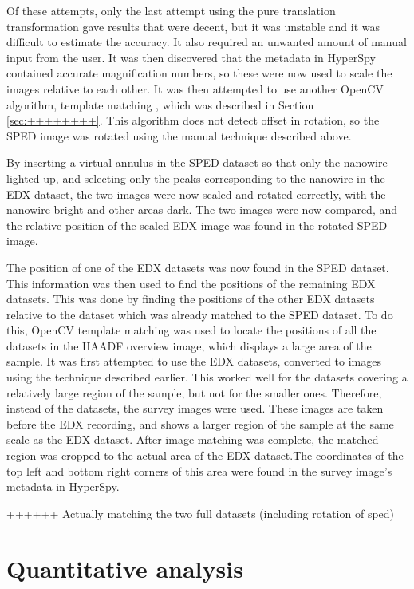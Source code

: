 Of these attempts, only the last attempt using the pure translation transformation gave results that were decent, but it was unstable and it was difficult to estimate the accuracy. It also required an unwanted amount of manual input from the user. It was then discovered that the metadata in HyperSpy contained accurate magnification numbers, so these were now used to scale the images relative to each other. It was then attempted to use another OpenCV algorithm, template matching \cite{open-cv-template-matching}, which was described in Section \ref{sec:++++++++}. This algorithm does not detect offset in rotation, so the SPED image was rotated using the manual technique described above.

By inserting a virtual annulus in the SPED dataset so that only the nanowire lighted up, and selecting only the peaks corresponding to the nanowire in the EDX dataset, the two images were now scaled and rotated correctly, with the nanowire bright and other areas dark.
The two images were now compared, and the relative position of the scaled EDX image was found in the rotated SPED image.

The position of one of the EDX datasets was now found in the SPED dataset. This information was then used to find the positions of the remaining EDX datasets. This was done by finding the positions of the other EDX datasets relative to the dataset which was already matched  to the SPED dataset. To do this, OpenCV template matching was used to locate the positions of all the datasets in the HAADF overview image, which displays a large area of the sample. It was first attempted to use the EDX datasets, converted to images using the technique described earlier. This worked well for the datasets covering a relatively large region of the sample, but not for the smaller ones. Therefore, instead of the datasets, the survey images were used. These images are taken before the EDX recording, and shows a larger region of the sample at the same scale as the EDX dataset. After image matching was complete, the matched region was cropped to the actual area of the EDX dataset.The coordinates of the top left and bottom right corners of this area were found in the survey image's metadata in HyperSpy.

++++++ Actually matching the two full datasets (including rotation of sped)

\section{Quantitative analysis}

